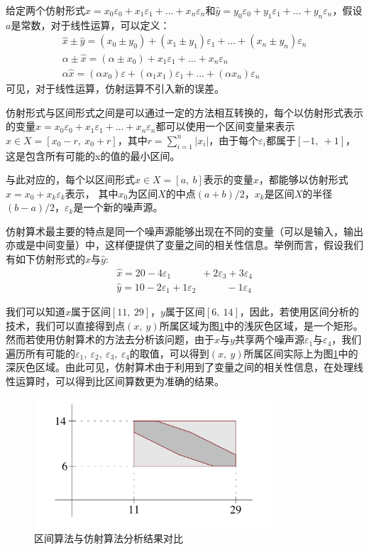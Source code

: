 给定两个仿射形式$\hat{x}  = x_0\varepsilon_0 + x_1\varepsilon_1 + ... + x_n\varepsilon_n$和$\hat{y}  = y_0\varepsilon_0 + y_1\varepsilon_1 + ... + y_n\varepsilon_n$，假设$a$是常数，对于线性运算，可以定义：
\begin{gather*}
    \hat{x} \pm \hat{y} = (x_0 \pm y_0) + (x_1 \pm y_1)\varepsilon_1 + ... + (x_n \pm y_n)\varepsilon_n \\
    \alpha \pm \hat{x} = (\alpha \pm x_0) + x_1\varepsilon_1 + ... + x_n\varepsilon_n \\
    \alpha \hat{x} = (\alpha x_0)\varepsilon + (\alpha_1 x_1)\varepsilon_1 + ... + (\alpha x_n)\varepsilon_n
\end{gather*}
可见，对于线性运算，仿射运算不引入新的误差。

仿射形式与区间形式之间是可以通过一定的方法相互转换的，每个以仿射形式表示的变量$\hat{x}  = x_0\varepsilon_0 + x_1\varepsilon_1 + ... + x_n\varepsilon_n$都可以使用一个区间变量来表示 $x \in X = [x_0 - r,\ x_0 + r]$，其中$r = \sum_{i=1}^{n} |x_i| $，由于每个$\varepsilon_i$都属于$[-1,\ +1]$，这是包含所有可能的x的值的最小区间。

与此对应的，每个以区间形式$ x \in X = [a,\ b]$表示的变量$x$，都能够以仿射形式$\hat{x} = x_0 + x_k\varepsilon_k$表示， 其中$x_0$为区间$X$的中点$(a+b)/2$，$x_k$是区间$X$的半径$(b-a)/2$，$\varepsilon_k$是一个新的噪声源。

仿射算术最主要的特点是同一个噪声源能够出现在不同的变量（可以是输入，输出亦或是中间变量）中，这样便提供了变量之间的相关性信息。举例而言，假设我们有如下仿射形式的$\hat{x}$与$\hat{y}$:
\begin{align*}
    \hat{x} = 20 - 4\varepsilon_1 \qquad \quad + 2\varepsilon_3 + 3\varepsilon_4 \\
    \hat{y} = 10 - 2\varepsilon_1 + 1\varepsilon_2 \qquad \quad - 1\varepsilon_4
\end{align*}

我们可以知道$x$属于区间$[11,\ 29]$，$y$属于区间$[6,\ 14]$，因此，若使用区间分析的技术，我们可以直接得到点$(x,\ y)$所属区域为图\ref{fig:interval_affine_diff}中的浅灰色区域，是一个矩形。然而若使用仿射算术的方法去分析该问题，由于$x$与$y$共享两个噪声源$\varepsilon_1$与$\varepsilon_4$，我们遍历所有可能的$\varepsilon_1,\ \varepsilon_2,\ \varepsilon_3,\ \varepsilon_4$的取值，可以得到$(x,\ y)$所属区间实际上为图\ref{fig:interval_affine_diff}中的深灰色区域。由此可见，仿射算术由于利用到了变量之间的相关性信息，在处理线性运算时，可以得到比区间算数更为准确的结果。

\begin{figure}[thbp]
    \centering
    \includegraphics[width=88mm]{fig/IntervalAffineDiff.png}
    \caption{区间算法与仿射算法分析结果对比} \label{fig:interval_affine_diff}
\end{figure}

